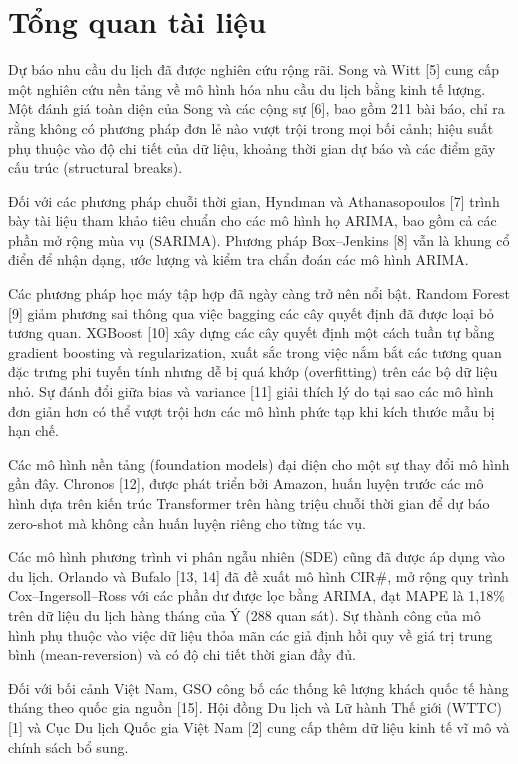 \documentclass[
]{article}
\begin{document}
\newpage

\section{Tổng quan tài liệu}\label{tux1ed5ng-quan-tuxe0i-liux1ec7u}

Dự báo nhu cầu du lịch đã được nghiên cứu rộng rãi. Song và Witt {[}5{]}
cung cấp một nghiên cứu nền tảng về mô hình hóa nhu cầu du lịch bằng
kinh tế lượng. Một đánh giá toàn diện của Song và các cộng sự {[}6{]},
bao gồm 211 bài báo, chỉ ra rằng không có phương pháp đơn lẻ nào vượt
trội trong mọi bối cảnh; hiệu suất phụ thuộc vào độ chi tiết của dữ
liệu, khoảng thời gian dự báo và các điểm gãy cấu trúc (structural
breaks).

Đối với các phương pháp chuỗi thời gian, Hyndman và Athanasopoulos
{[}7{]} trình bày tài liệu tham khảo tiêu chuẩn cho các mô hình họ
ARIMA, bao gồm cả các phần mở rộng mùa vụ (SARIMA). Phương pháp
Box--Jenkins {[}8{]} vẫn là khung cổ điển để nhận dạng, ước lượng và
kiểm tra chẩn đoán các mô hình ARIMA.

Các phương pháp học máy tập hợp đã ngày càng trở nên nổi bật. Random
Forest {[}9{]} giảm phương sai thông qua việc bagging các cây quyết định
đã được loại bỏ tương quan. XGBoost {[}10{]} xây dựng các cây quyết định
một cách tuần tự bằng gradient boosting và regularization, xuất sắc
trong việc nắm bắt các tương quan đặc trưng phi tuyến tính nhưng dễ bị
quá khớp (overfitting) trên các bộ dữ liệu nhỏ. Sự đánh đổi giữa bias và
variance {[}11{]} giải thích lý do tại sao các mô hình đơn giản hơn có
thể vượt trội hơn các mô hình phức tạp khi kích thước mẫu bị hạn chế.

Các mô hình nền tảng (foundation models) đại diện cho một sự thay đổi mô
hình gần đây. Chronos {[}12{]}, được phát triển bởi Amazon, huấn luyện
trước các mô hình dựa trên kiến trúc Transformer trên hàng triệu chuỗi
thời gian để dự báo zero-shot mà không cần huấn luyện riêng cho từng tác
vụ.

Các mô hình phương trình vi phân ngẫu nhiên (SDE) cũng đã được áp dụng
vào du lịch. Orlando và Bufalo {[}13, 14{]} đã đề xuất mô hình CIR\#, mở
rộng quy trình Cox--Ingersoll--Ross với các phần dư được lọc bằng ARIMA,
đạt MAPE là 1,18\% trên dữ liệu du lịch hàng tháng của Ý (288 quan sát).
Sự thành công của mô hình phụ thuộc vào việc dữ liệu thỏa mãn các giả
định hồi quy về giá trị trung bình (mean-reversion) và có độ chi tiết
thời gian đầy đủ.

Đối với bối cảnh Việt Nam, GSO công bố các thống kê lượng khách quốc tế
hàng tháng theo quốc gia nguồn {[}15{]}. Hội đồng Du lịch và Lữ hành Thế
giới (WTTC) {[}1{]} và Cục Du lịch Quốc gia Việt Nam {[}2{]} cung cấp
thêm dữ liệu kinh tế vĩ mô và chính sách bổ sung.
\end{document}
